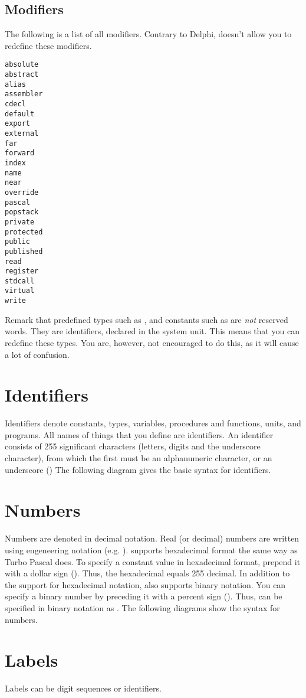 \documentclass{report}
\begin{document}
\subsection{Modifiers}
The following is a list of all modifiers. Contrary to Delphi, \fpc doesn't
allow you to redefine these modifiers.
\begin{multicols}{4}
\begin{verbatim}
absolute
abstract
alias
assembler
cdecl
default
export
external
far
forward
index
name
near
override
pascal
popstack
private
protected
public
published
read
register
stdcall
virtual
write
\end{verbatim}
\end{multicols}
Remark that predefined types such as ,  and constants
such as  are {\em not} reserved words. They are
identifiers, declared in the system unit. This means that you can redefine
these types. You are, however, not encouraged to do this, as it will cause
a lot of confusion.
\section{Identifiers}
Identifiers denote constants, types, variables, procedures and functions,
units, and programs. All names of things that you define are identifiers.
An identifier consists of 255 significant characters (letters, digits and
the underscore character), from which the first must be an alphanumeric
character, or an underscore (\var{\_})
The following diagram gives the basic syntax for identifiers.

\section{Numbers}
Numbers are denoted in decimal notation. Real (or decimal) numbers are
written using engeneering notation (e.g. ).
\fpc supports hexadecimal format the same way as Turbo Pascal does. To
specify a constant value in hexadecimal format, prepend it with a dollar
sign (\var{\$}). Thus, the hexadecimal  equals 255 decimal.
In addition to the support for hexadecimal notation, \fpc also supports
binary notation. You can specify a binary number by preceding it with a
percent sign (\var{\%}). Thus,  can be specified in binary notation
as .
The following diagrams show the syntax for numbers.

\section{Labels}
Labels can be digit sequences or identifiers.

\end{document}
